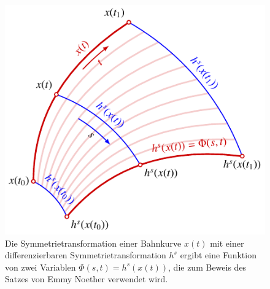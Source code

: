 %
%
%
\begin{figure}
\centering
\includegraphics{chapters/100-symmetrien/images/phi.pdf}
\caption{Die Symmetrietransformation einer Bahnkurve $x(t)$ mit einer
differenzierbaren Symmetrietransformation $h^s$ ergibt eine Funktion von
zwei Variablen $\Phi(s,t)=h^s(x(t))$, die zum Beweis des Satzes von
Emmy Noether verwendet wird.
\label{buch:symmetrien:noether:fig:phi}}
\end{figure}
